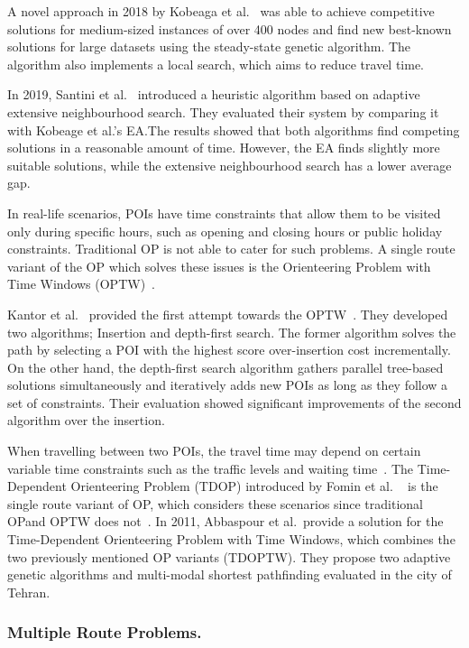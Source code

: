 A novel approach in 2018  by Kobeaga et
al.~\cite{Kobeaga2018} was able to achieve
competitive solutions for medium-sized instances of
over 400 nodes and find new best-known solutions for
large datasets using the steady-state genetic
algorithm. The algorithm also implements a local
search, which aims to reduce travel time.

In 2019, Santini et al.~\cite{Santini2019} introduced a heuristic algorithm based on
adaptive extensive neighbourhood search. They evaluated their system by
comparing it with Kobeage et al.'s EA.\@ The results showed that both algorithms
find competing solutions in a reasonable amount of time. However, the EA finds
slightly more suitable solutions, while the extensive neighbourhood search has
a lower average gap.

In real-life scenarios, POIs have time constraints that allow them to be
visited only during specific hours, such as opening and closing hours or public
holiday constraints. Traditional OP is not able to cater for such problems. A
single route variant of the OP which solves these issues is the Orienteering
Problem with Time Windows (OPTW)~\cite{Gavalas2014a}. 

Kantor et al.~\cite{Kantor1992} provided the first attempt towards the
OPTW~\cite{Vansteenwegen2011}. They developed two algorithms;
Insertion and depth-first search. The former algorithm solves the path by
selecting a POI with the highest score over-insertion cost incrementally. On
the other hand, the depth-first search algorithm gathers parallel tree-based
solutions simultaneously and iteratively adds new POIs as long as they follow a
set of constraints. Their evaluation showed significant improvements of the
second algorithm over the insertion. 

When travelling between two POIs, the travel time may depend on certain
variable time constraints such as the traffic levels and waiting time~\cite{Herzog2020}.
The Time-Dependent Orienteering Problem (TDOP) introduced by Fomin et al.
~\cite{Fomin2002} is the single route variant of OP, which considers
these scenarios since traditional OPand OPTW does not~\cite{Gunawan2016}. In 2011, Abbaspour et
al.~\cite{Abbaspour2011}provide a solution for the
Time-Dependent Orienteering Problem with Time Windows, which combines the two
previously mentioned OP variants (TDOPTW).  They propose two adaptive genetic
algorithms and multi-modal shortest pathfinding evaluated in the city of
Tehran.


\subsubsection{Multiple Route Problems.}

